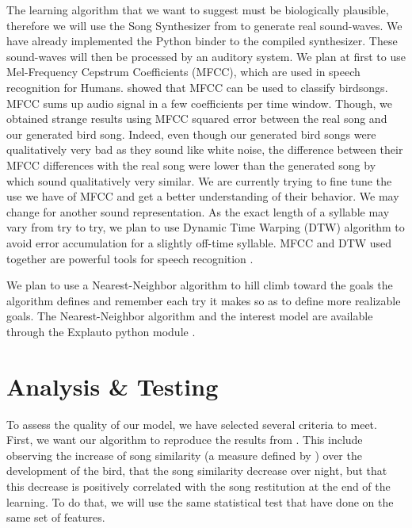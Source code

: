 \documentclass[a4paper, 11pt]{article}
\begin{document}
The learning algorithm that we want to suggest must be biologically plausible,
therefore we will use the Song Synthesizer from \textcite{boari_automatic_2015}
to generate real sound-waves. We have already implemented the Python binder to
the compiled synthesizer. These sound-waves will then be processed by an
auditory system. We plan at first to use Mel-Frequency Cepstrum Coefficients
(MFCC), which are used in speech recognition for Humans.
\textcite{chou_studies_2008} showed that MFCC can be used to classify birdsongs.
MFCC sums up audio signal in a few coefficients per time window. Though, we
obtained strange results using MFCC squared error between the real song and our
generated bird song. Indeed, even though our generated bird songs were
qualitatively very bad as they sound like white noise, the difference between
their MFCC differences with the real song were lower than the generated song by
\textcite{boari_automatic_2015} which sound qualitatively very similar. We are
currently trying to fine tune the use we have of MFCC and get a better
understanding of their behavior. We may change for another sound representation.
As the exact length of a syllable may vary from try to try, we plan to use
Dynamic Time Warping (DTW) algorithm to avoid error accumulation for a slightly
off-time syllable. MFCC and DTW used together are powerful tools for speech
recognition \parencite{muda_voice_2010}.

We plan to use a Nearest-Neighbor algorithm to hill climb toward the goals the
algorithm defines and remember each try it makes so as to define more realizable
goals. The Nearest-Neighbor algorithm and the interest model are available
through the Explauto python module \parencite{moulin-frier_explauto:_2014}.

\section*{Analysis \& Testing}

To assess the quality of our model, we have selected several criteria to meet.
First, we want our algorithm to reproduce the results from
\textcite{deregnaucourt_how_2005}. This include observing the increase of song
similarity (a measure defined by \textcite{tchernichovski_procedure_2000}) over
the development of the bird, that the song similarity decrease over night, but
that this decrease is positively correlated with the song restitution at the end
of the learning. To do that, we will use the same statistical test that
\textcite{deregnaucourt_how_2005} have done on the same set of features.
\end{document}
